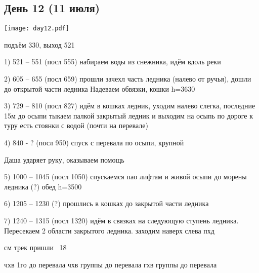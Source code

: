 \graphicspath{{Pictures/Chapter5/Day12}}


\subsection{День 12 (11 июля)}\label{subsec:Day12}
    \parbox[c]{\textwidth}{%
        \texttt{[image: day12.pdf]}\label{fig:Day12_map}%
    }
    \vspace{0.8cm}
подъём 330, выход 521

1) 521 -- 551 (посл 555) набираем воды из снежника, идём вдоль реки

2) 605 -- 655 (посл 659) прошли зачехл часть ледника (налево от ручья), дошли до открытой части ледника Надеваем обвязки, кошки h=3630

3) 729 -- 810 (посл 827) идём в кошках ледник, уходим налево слегка, последние 15м до осыпи тыкаем палкой закрытый ледник и выходим на осыпь
по дороге к туру есть стоянки с водой (почти на перевале)

4) 840 - ? (посл 950) спуск с перевала по осыпи, крупной

Даша ударяет руку, оказываем помощь

5) 1000 -- 1045 (посл 1050) спускаемся пао лифтам и живой осыпи до морены ледника (?) обед h=3500

6) 1205 -- 1230 (?) прошлись в кошках до закрытой части ледника

7) 1240 -- 1315 (посл 1320) идём в связках на следующую ступень ледника. Пересекаем 2 области закрытого ледника. заходим наверх слева пхд

см трек пришли ~18

чхв 1го до перевала
чхв группы до перевала
гхв группы до перевала



    \FloatBarrier
